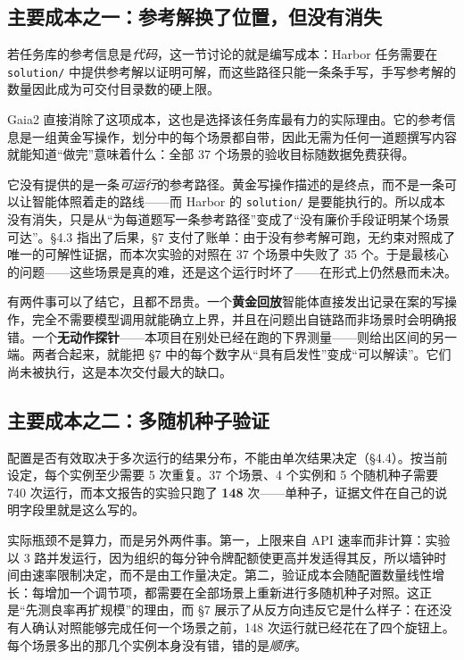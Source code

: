 \documentclass[UTF8,11pt,fontset=fandol]{ctexart}
\begin{document}
\subsection{主要成本之一：参考解换了位置，但没有消失}

若任务库的参考信息是\emph{代码}，这一节讨论的就是编写成本：Harbor 任务需要在 \texttt{solution/} 中提供参考解以证明可解，而这些路径只能一条条手写，手写参考解的数量因此成为可交付目录数的硬上限。

Gaia2 直接消除了这项成本，这也是选择该任务库最有力的实际理由。它的参考信息是一组黄金写操作，划分中的每个场景都自带，因此无需为任何一道题撰写内容就能知道“做完”意味着什么：全部 37 个场景的验收目标随数据免费获得。

它没有提供的是一条\emph{可运行}的参考路径。黄金写操作描述的是终点，而不是一条可以让智能体照着走的路线——而 Harbor 的 \texttt{solution/} 是要能执行的。所以成本没有消失，只是从“为每道题写一条参考路径”变成了“没有廉价手段证明某个场景可达”。\S4.3 指出了后果，\S7 支付了账单：由于没有参考解可跑，无约束对照成了唯一的可解性证据，而本次实验的对照在 37 个场景中失败了 35 个。于是最核心的问题——这些场景是真的难，还是这个运行时坏了——在形式上仍然悬而未决。

有两件事可以了结它，且都不昂贵。一个\textbf{黄金回放}智能体直接发出记录在案的写操作，完全不需要模型调用就能确立上界，并且在问题出自链路而非场景时会明确报错。一个\textbf{无动作探针}——本项目在别处已经在跑的下界测量——则给出区间的另一端。两者合起来，就能把 \S7 中的每个数字从“具有启发性”变成“可以解读”。它们尚未被执行，这是本次交付最大的缺口。

\subsection{主要成本之二：多随机种子验证}

配置是否有效取决于多次运行的结果分布，不能由单次结果决定（\S4.4）。按当前设定，每个实例至少需要 5 次重复。37 个场景、4 个实例和 5 个随机种子需要 740 次运行，而本文报告的实验只跑了 \textbf{148} 次——单种子，证据文件在自己的说明字段里就是这么写的。

实际瓶颈不是算力，而是另外两件事。第一，上限来自 API 速率而非计算：实验以 3 路并发运行，因为组织的每分钟令牌配额使更高并发适得其反，所以墙钟时间由速率限制决定，而不是由工作量决定。第二，验证成本会随配置数量线性增长：每增加一个调节项，都需要在全部场景上重新进行多随机种子对照。这正是“先测良率再扩规模”的理由，而 \S7 展示了从反方向违反它是什么样子：在还没有人确认对照能够完成任何一个场景之前，148 次运行就已经花在了四个旋钮上。每个场景多出的那几个实例本身没有错，错的是\emph{顺序}。
\end{document}
